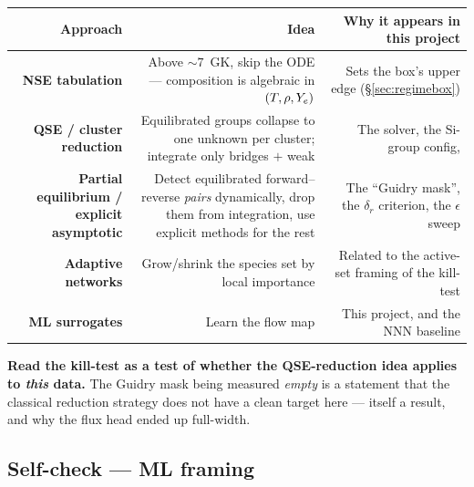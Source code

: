 \begin{center}
\small
\begin{tabularx}{\textwidth}{@{}R{0.8} R{1.25} R{0.95}@{}}
\toprule
\textbf{Approach} & \textbf{Idea} &
\textbf{Why it appears in this project} \\
\midrule
\textbf{NSE tabulation} &
  Above ${\sim}7$~GK, skip the ODE --- composition is algebraic in
  $(T,\rho,Y_{e})$ \citep{hix1999b} &
  Sets the box's upper edge (\S\ref{sec:regimebox}) \\
\textbf{QSE / cluster reduction} \citep{hix1996,hix1999a,hix2007} &
  Equilibrated groups collapse to one unknown per cluster; integrate only
  bridges $+$ weak &
  The  solver, the Si-group config,  \\
\textbf{Partial equilibrium / explicit asymptotic} \citep{guidry2013} &
  Detect equilibrated forward--reverse \emph{pairs} dynamically, drop them from
  integration, use explicit methods for the rest &
  The ``Guidry mask'', the $\delta_r$ criterion, the $\epsilon$ sweep \\
\textbf{Adaptive networks} &
  Grow/shrink the species set by local importance &
  Related to the active-set framing of the kill-test \\
\textbf{ML surrogates} & Learn the flow map &
  This project, and the NNN baseline \\
\bottomrule
\end{tabularx}
\end{center}

\begin{aside}
\textbf{Read the kill-test as a test of whether the QSE-reduction idea applies
to \emph{this} data.} The Guidry mask being measured \emph{empty} is a statement
that the classical reduction strategy does not have a clean target here ---
itself a result, and why the flux head ended up full-width.
\end{aside}

\subsection*{Self-check --- ML framing}
\label{sec:selfcheck-ml}

